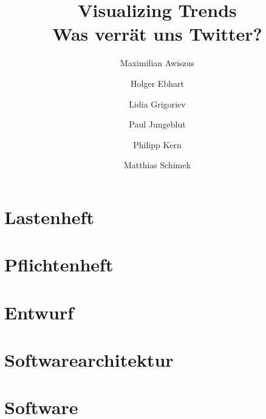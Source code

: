 \documentclass[a4paper]{scrreprt}
\title{Visualizing Trends\\Was verrät uns Twitter?}
\author{Maximilian Awiszus\and Holger Ebhart\and Lidia Grigoriev\and Paul Jungeblut\and Philipp Kern\and Matthias Schimek}
\begin{document}
	\maketitle
	\tableofcontents
	\chapter{Lastenheft}
		
	\chapter{Pflichtenheft}
		
	\chapter{Entwurf}
		
	\chapter{Softwarearchitektur}
		
	\chapter{Software}
		
\end{document}
